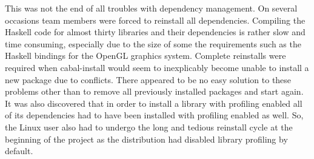 This was not the end of all troubles with dependency management. On several occasions team
members were forced to reinstall all dependencies. Compiling the Haskell code for almost thirty
libraries and their dependencies is rather slow and time consuming, especially due to the size
of some the requirements such as the Haskell bindings for the OpenGL graphics system.
Complete reinstalls were required when cabal-install would seem to inexplicably become unable
to install a new package due to conflicts. There appeared to be no easy solution to these
problems other than to remove all previously installed packages and start again. It was also
discovered that in order to install a library with profiling enabled all of its dependencies
had to have been installed with profiling enabled as well. So, the Linux user also had to
undergo the long and tedious reinstall cycle at the beginning of the project as the distribution
had disabled library profiling by default.
